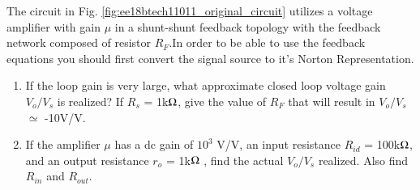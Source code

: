 The circuit in Fig. \ref{fig:ee18btech11011_original_circuit} utilizes a voltage amplifier with gain $\mu$ in a shunt-shunt feedback topology with the feedback network composed of resistor $R_{F}$.In order to be able to use the feedback equations you should first convert the signal source to it's Norton Representation.
\begin{enumerate}
    \item If the loop gain is very large, what approximate closed loop voltage gain $V_{o}/V_{s}$ is realized? If $R_{s}$ = 1k$\ohm$, give the value of $R_{F}$ that will result in $V_{o}/V_{s}$ $\simeq$ -10V/V.
    \item If the amplifier $\mu$ has a dc gain of $10^{3}$ V/V, an input
    resistance $R_{i d}$ = 100k$\ohm$, and an output resistance $r_{o}$ = 1k$\ohm$
    , find the actual $V_{o}/V_{s}$ realized. Also find $R_{i n}$ and $R_{o u t}$.
\end{enumerate}

